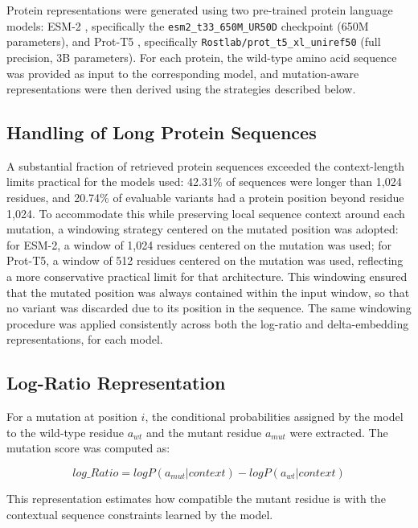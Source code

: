 \documentclass[12pt]{article}
\begin{document}
Protein representations were generated using two pre-trained protein language models: ESM-2 \cite{esm2}, specifically the \texttt{esm2\_t33\_650M\_UR50D} checkpoint (650M parameters), and Prot-T5 \cite{prottrans}, specifically \texttt{Rostlab/prot\_t5\_xl\_uniref50} (full precision, 3B parameters). For each protein, the wild-type amino acid sequence was provided as input to the corresponding model, and mutation-aware representations were then derived using the strategies described below.

\subsection{Handling of Long Protein Sequences}

A substantial fraction of retrieved protein sequences exceeded the context-length limits practical for the models used: 42.31\% of sequences were longer than 1,024 residues, and 20.74\% of evaluable variants had a protein position beyond residue 1,024. To accommodate this while preserving local sequence context around each mutation, a windowing strategy centered on the mutated position was adopted: for ESM-2, a window of 1,024 residues centered on the mutation was used; for Prot-T5, a window of 512 residues centered on the mutation was used, reflecting a more conservative practical limit for that architecture. This windowing ensured that the mutated position was always contained within the input window, so that no variant was discarded due to its position in the sequence. The same windowing procedure was applied consistently across both the log-ratio and delta-embedding representations, for each model.

\subsection{Log-Ratio Representation}

For a mutation at position $i$, the conditional probabilities assigned by the model to the wild-type residue $a_{wt}$ and the mutant residue $a_{mut}$ were extracted. The mutation score was computed as:

\begin{equation}
    log\_Ratio = logP(a_{mut} | context) - logP(a_{wt} | context)
\end{equation}

This representation estimates how compatible the mutant residue is with the contextual sequence constraints learned by the model.
\end{document}
